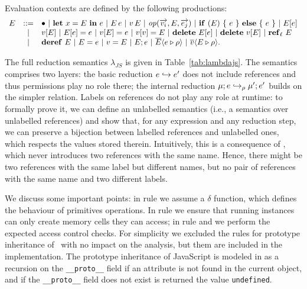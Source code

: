 Evaluation contexts are defined by the following productions:
$$
\begin{array}{lcl}
E & ::= & \bullet ~|~ \mathbf{let}\ x = E\ \mathbf{in}\ e ~|~ E\, e~|~v\, E ~|~ \mathit{op}(\overrightarrow{v_i},E,\overrightarrow{e_j}) ~|~ \mathbf{if}\ (E)\ \{\ e\ \}\ \mathbf{else}\ \{\ e\ \} ~|~ E[e] \\
& | & v[E] ~|~ E[e] = e ~|~ v[E] = e ~|~ v[v] = E ~|~ \mathbf{delete}\ E[e] ~|~ \mathbf{delete}\ v[E] ~|~ \mathbf{ref}_{\ell}\ E \\
& | &  \mathbf{deref}\ E ~|~ E = e ~|~ v = E ~|~ E;e ~|~ \overline{E} \langle e \triangleright \rho \rangle~|~\overline{v} \langle E \triangleright \rho \rangle.
\end{array}
$$

The full reduction semantics $\lambda_{JS}$ is given in
Table~\ref{tab:lambdajs}. The semantics comprises two layers: the
basic reduction $e \hookrightarrow e'$ does not include references and thus
permissions play no role there; the internal reduction $\mu;e \hookrightarrow_\rho
\mu';e'$ builds on the simpler relation. Labels on references do not
play any role at runtime: to formally prove it, we can define an
unlabelled semantics (i.e., a semantics over unlabelled references) and
show that, for any expression and any reduction step, we can preserve
a bijection between labelled references and unlabelled ones, which
respects the values stored therein. Intuitively, this is a consequence
of , which never introduces two references with the same
name. Hence, there might be two references with the same label but
different names, but no pair of references with the same name and two
different labels.

We discuss some important points: in rule  we assume a $\delta$ function, which defines the behaviour of primitives operations. In rule  we ensure that running instances can only create memory cells they can access; in rule  and  we perform the expected access control checks. For simplicity we excluded the rules for prototype inheritance of \ljs\ with no impact on the analysis, but them are included in the implementation. The prototype inheritance of JavaScript is modeled in \ljs as a recursion on the \texttt{\_\_proto\_\_} field if an attribute is not found in the current object, and if the \texttt{\_\_proto\_\_} field does not exist is returned the value \texttt{undefined}.

